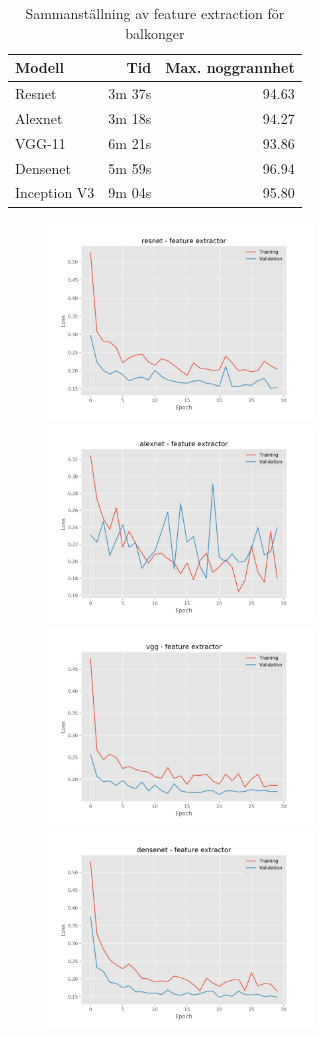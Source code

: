 \documentclass[]{kththesis}
\begin{document}
\begin{table}
  \centering
  \begin{tabular}{|l|r|r|}
    Modell & Tid & Max. noggrannhet \\ 
    \hline
    Resnet       & 3m 37s & 94.63 \\
    Alexnet      & 3m 18s & 94.27 \\
    VGG-11       & 6m 21s & 93.86 \\
    Densenet     & 5m 59s & 96.94 \\
    Inception V3 & 9m 04s & 95.80 \\
  \end{tabular}
  \caption{Sammanställning av feature extraction för balkonger}
\end{table}

\begin{figure}[h]
  \includegraphics[width=7cm]{b_l_resnet_fe}
  \includegraphics[width=7cm]{b_l_alexnet_fe}
  \includegraphics[width=7cm]{b_l_vgg_fe}
  \includegraphics[width=7cm]{b_l_densenet_fe}

\end{figure}
\end{document}
